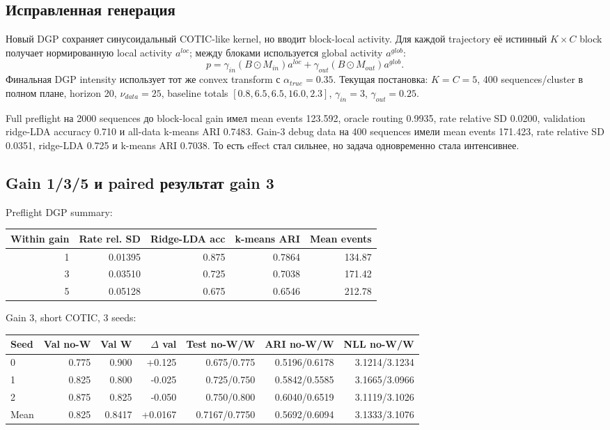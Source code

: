 \documentclass[11pt,a4paper]{article}
\begin{document}
\subsection{Исправленная генерация}

Новый DGP сохраняет синусоидальный COTIC-like kernel, но вводит block-local
activity. Для каждой trajectory её истинный $K\times C$ block получает
нормированную local activity $a^{loc}$; между блоками используется global
activity $a^{glob}$:
\[
p=\gamma_{in}(B\odot M_{in})a^{loc}
+\gamma_{out}(B\odot M_{out})a^{glob}.
\]
Финальная DGP intensity использует тот же convex transform с
$\alpha_{true}=0.35$. Текущая постановка: $K=C=5$, 400 sequences/cluster в
полном плане, horizon 20, $\nu_{data}=25$, baseline totals
$[0.8,6.5,6.5,16.0,2.3]$, $\gamma_{in}=3$, $\gamma_{out}=0.25$.

Full preflight на 2000 sequences до block-local gain имел mean events 123.592,
oracle routing 0.9935, rate relative SD 0.0200, validation ridge-LDA accuracy
0.710 и all-data k-means ARI 0.7483. Gain-3 debug data на 400 sequences имели
mean events 171.423, rate relative SD 0.0351, ridge-LDA 0.725 и k-means ARI
0.7038. То есть effect стал сильнее, но задача одновременно стала интенсивнее.

\subsection{Gain 1/3/5 и paired результат gain 3}

Preflight DGP summary:
\begin{center}
\begin{tabular}{rrrrr}
\toprule
Within gain & Rate rel. SD & Ridge-LDA acc & k-means ARI & Mean events \\
\midrule
1 & 0.01395 & 0.875 & 0.7864 & 134.87 \\
3 & 0.03510 & 0.725 & 0.7038 & 171.42 \\
5 & 0.05128 & 0.675 & 0.6546 & 212.78 \\
\bottomrule
\end{tabular}
\end{center}

Gain 3, short COTIC, 3 seeds:
\begin{center}
\small
\begin{tabular}{lrrrrrr}
\toprule
Seed & Val no-W & Val W & $\Delta$ val & Test no-W/W & ARI no-W/W & NLL no-W/W \\
\midrule
0 & 0.775 & 0.900 & +0.125 & 0.675/0.775 & 0.5196/0.6178 & 3.1214/3.1234 \\
1 & 0.825 & 0.800 & -0.025 & 0.725/0.750 & 0.5842/0.5585 & 3.1665/3.0966 \\
2 & 0.875 & 0.825 & -0.050 & 0.750/0.800 & 0.6040/0.6519 & 3.1119/3.1026 \\
\midrule
Mean & 0.825 & 0.8417 & +0.0167 & 0.7167/0.7750 & 0.5692/0.6094 & 3.1333/3.1076 \\
\bottomrule
\end{tabular}
\end{center}
\end{document}
